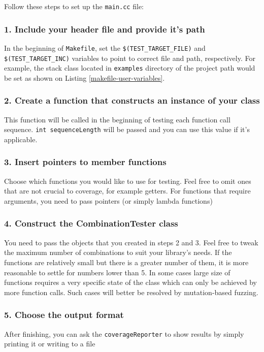 \documentclass{elteikthesis}[2018/06/06]
\newcommand*{\code}{\lstinline[keywordstyle=\color{violet}, basicstyle=\color{violet}]}
\begin{document}
Follow these steps to set up the \code{main.cc} file: \\
\subsubsection{1. Include your header file and provide it's path}
\label{sec-2-4-2-1}
In the beginning of \code{Makefile}, set the \code{$(TEST_TARGET_FILE)} and \code{$(TEST_TARGET_INC)} variables to point to correct file and path, respectively. For example, the stack class located in \code{examples} directory of the project path would be set as shown on Listing \ref{makefile-user-variables}. \\

\subsubsection{2. Create a function that constructs an instance of your class}
\label{sec-2-4-2-2}
This function will be called in the beginning of testing each function call sequence. \code{int sequenceLength} will be passed and you can use this value if it's applicable. \\
\subsubsection{3. Insert pointers to member functions}
\label{sec-2-4-2-3}
Choose which functions you would like to use for testing. Feel free to omit ones that are not crucial to coverage, for example getters. For functions that require arguments, you need to pass pointers (or simply lambda functions) \\
\subsubsection{4. Construct the CombinationTester class}
\label{sec-2-4-2-4}
You need to pass the objects that you created in steps 2 and 3. Feel free to tweak the maximum number of combinations to suit your library's needs. If the functions are relatively small but there is a greater number of them, it is more reasonable to settle for numbers lower than 5. In some cases large size of functions requires a very specific state of the class which can only be achieved by more function calls. Such cases will better be resolved by mutation-based fuzzing. \\
\subsubsection{5. Choose the output format}
\label{sec-2-4-2-5}
After finishing, you can ask the \code{coverageReporter} to show results by simply printing it or writing to a file \\
\end{document}
